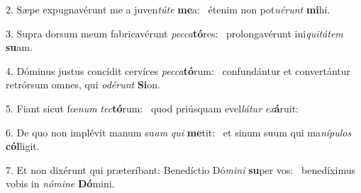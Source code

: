 2. Sæpe expugnavérunt me a juven\textit{tú}\textit{te} \textbf{me}a: \ast\  étenim non pot\textit{u}\textit{é}\textit{runt} \textbf{mi}hi.\

3. Supra dorsum meum fabricavérunt \textit{pec}\textit{ca}\textbf{tó}res: \ast\  prolongavérunt ini\textit{qui}\textit{tá}\textit{tem} \textbf{su}am.\

4. Dóminus justus concídit cervíces \textit{pec}\textit{ca}\textbf{tó}rum: \ast\  confundántur et convertántur retrórsum omnes, qui \textit{o}\textit{dé}\textit{runt} \textbf{Si}on.\

5. Fiant sicut fœ\textit{num} \textit{tec}\textbf{tó}rum: \ast\  quod priúsquam evel\textit{lá}\textit{tur} \textit{ex}\textbf{á}ruit:\

6. De quo non implévit manum su\textit{am} \textit{qui} \textbf{me}tit: \ast\  et sinum suum qui ma\textit{ní}\textit{pu}\textit{los} \textbf{cól}ligit.\

7. Et non dixérunt qui præteríbant: Benedíctio Dó\textit{mi}\textit{ni} \textbf{su}per vos: \ast\  benedíximus vobis in \textit{nó}\textit{mi}\textit{ne} \textbf{Dó}mini.\

